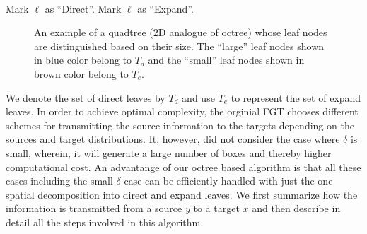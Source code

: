 {\tt
\begin{algorithmic}
\STATE
          \STATE Mark $\ell$ as ``Direct''. 
      \ELSE
          \STATE Mark $\ell$ as ``Expand''. 
      \ENDIF
  \ENDFOR
\STATE
\end{algorithmic}
}

\begin{figure}
\begin{center}
\caption{\label{f:directExpand} An example of a quadtree (2D analogue of octree) whose leaf nodes are distinguished based 
on their size. The ``large'' leaf nodes shown in blue color belong to $T_d$ and 
the ``small'' leaf nodes shown in brown color belong to $T_e$.}  
\end{center}
\end{figure}

We denote the set of direct leaves by $T_d$ and use $T_e$ to represent the set of expand leaves. In order to achieve optimal complexity, the 
orginial FGT \cite{fgt} chooses different schemes for transmitting the source information to the targets 
depending on the sources and target distributions. It, however, did not consider the case where $\delta$ is small, wherein, it will generate a
large number of boxes and thereby higher computational cost. An advantange of our octree based algorithm is that all these cases including 
the small $\delta$ case can be efficiently handled with just the one spatial decomposition into direct and expand leaves. We first summarize 
how the information is transmitted from a source $y$ to a target $x$ and then describe in detail all the steps involved in this algorithm.


